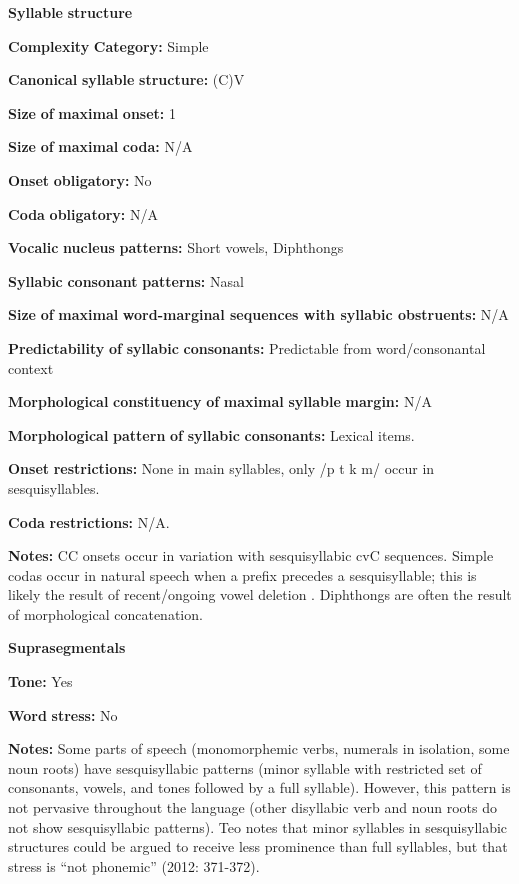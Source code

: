 \textbf{Syllable} \textbf{structure}

\textbf{Complexity} \textbf{Category:} Simple

\textbf{Canonical} \textbf{syllable} \textbf{structure:} (C)V \citep[57-64]{Teo2009}

\textbf{Size} \textbf{of} \textbf{maximal} \textbf{onset:} 1

\textbf{Size} \textbf{of} \textbf{maximal} \textbf{coda:} N/A

\textbf{Onset} \textbf{obligatory:} No

\textbf{Coda} \textbf{obligatory:} N/A

\textbf{Vocalic} \textbf{nucleus} \textbf{patterns:} Short vowels, Diphthongs

\textbf{Syllabic} \textbf{consonant} \textbf{patterns:} Nasal

\textbf{Size} \textbf{of} \textbf{maximal} \textbf{word{}-marginal sequences with syllabic obstruents:} N/A

\textbf{Predictability} \textbf{of} \textbf{syllabic} \textbf{consonants:} Predictable from word/consonantal context

\textbf{Morphological} \textbf{constituency} \textbf{of} \textbf{maximal} \textbf{syllable} \textbf{margin:} N/A

\textbf{Morphological} \textbf{pattern} \textbf{of} \textbf{syllabic} \textbf{consonants:} Lexical items.

\textbf{Onset} \textbf{restrictions:} None in main syllables, only /p t k m/ occur in sesquisyllables.

\textbf{Coda} \textbf{restrictions:} N/A.

\textbf{Notes:} CC onsets occur in variation with sesquisyllabic cvC sequences. Simple codas occur in natural speech when a prefix precedes a sesquisyllable; this is likely the result of recent/ongoing vowel deletion \citep[62-4]{Teo2009}. Diphthongs are often the result of morphological concatenation.

\textbf{Suprasegmentals}

\textbf{Tone:} Yes

\textbf{Word} \textbf{stress:} No

\textbf{Notes:} Some parts of speech (monomorphemic verbs, numerals in isolation, some noun roots) have sesquisyllabic patterns  (minor syllable with restricted set of consonants, vowels, and tones followed by a full syllable). However, this pattern is not pervasive throughout the language (other disyllabic verb and noun roots do not show sesquisyllabic patterns). Teo notes that minor syllables in sesquisyllabic structures could be argued to receive less prominence than full syllables, but that stress is “not phonemic” (2012: 371-372).

